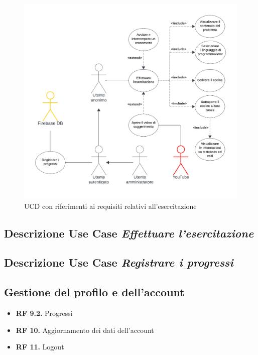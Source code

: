 \documentclass[11pt, a4paper]{article}
\theoremstyle{definition} %
\begin{document}
\begin{figure}[H]
\centering
\hspace*{-1cm}
\includegraphics[scale=0.8]{materiale/ucdiagrams/ucesercitazione.pdf}
\caption{UCD con riferimenti ai requisiti relativi all'esercitazione}
\end{figure}

\subsection*{Descrizione Use Case \textit{Effettuare l'esercitazione}}

\subsection*{Descrizione Use Case \textit{Registrare i progressi}}

\newpage
\subsection{Gestione del profilo e dell'account}
\begin{itemize}
    \item \textbf{RF 9.2.} Progressi
    \item \textbf{RF 10.} Aggiornamento dei dati dell'account
    \item \textbf{RF 11.} Logout
\end{itemize}
\end{document}
